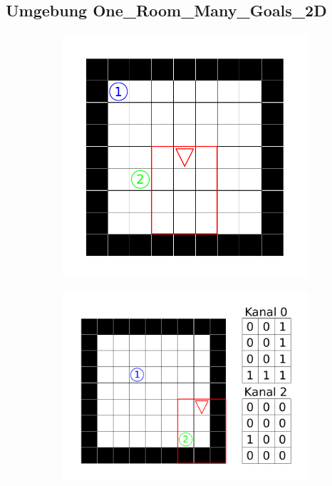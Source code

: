 \subsection{Umgebung \glqq One\_Room\_Many\_Goals\_2D\grqq}

\begin{figure}[ht!]
  \begin{subfigure}[c]{0.45\textwidth}
    \includegraphics[keepaspectratio,width=\textwidth]{abbildungen/9x9_ep_start.pdf}
    \subcaption{}
    \label{fig_9x9_ep_start}
  \end{subfigure}
  \begin{subfigure}[c]{0.6\textwidth}
    \includegraphics[keepaspectratio,width=\textwidth]{abbildungen/9x9_sample_obs.pdf}

\end{subfigure}
\end{figure}
